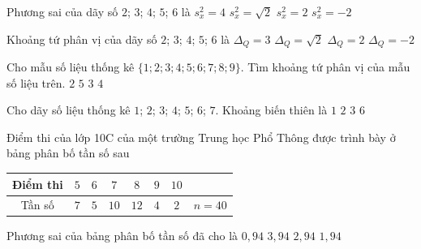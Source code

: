 \begin{ex}%
	Phương sai của dãy số $2$; $3$; $4$; $5$; $6$ là
	\choice
	{$s_x^2=4$}
	{$s_x^2=\sqrt{2}$}
	{\True $s_x^2=2$}
	{$s_x^2=-2$}
\end{ex}

\begin{ex}%
	Khoảng tứ phân vị của dãy số $2$; $3$; $4$; $5$; $6$ là
	\choice
	{\True $\Delta_Q=3$}
	{$\Delta_Q=\sqrt{2}$}
	{$\Delta_Q=2$}
	{$\Delta_Q=-2$}
\end{ex}	

\begin{ex}%
	Cho mẫu số liệu thống kê $\{ 1;2;3;4;5;6;7;8;9 \}$. Tìm khoảng tứ phân vị của mẫu số liệu trên.
	\choice
	{$2$}
	{\True $5$}
	{$3$}
	{$4$}
\end{ex}	

\begin{ex}%
	Cho dãy số liệu thống kê $1$; $2$; $3$; $4$; $5$; $6$; $7$. Khoảng biến thiên là 
	\choice
	{$1$}
	{$2$}
	{$3$}
	{\True $6$}
\end{ex}	

\begin{ex}%
	Điểm thi của lớp 10C của một trường Trung học Phổ Thông được trình bày ở bảng phân bố tần số sau
	\begin{center}
		\begin{tabular}{|c|c|c|c|c|c|c|c|}
			\hline Điểm thi	& $5$ & $6$ & $7$ & $8$ & $9$ & $10$ & \\
			\hline Tần số	& $7$ & $5$ & $10$ & $12$ & $4$ & $2$ & $n=40$\\
			\hline 
		\end{tabular}
	\end{center}
	Phương sai của bảng phân bố tần số đã cho là 
	\choice
	{$0{,}94$}
	{$3{,}94$}
	{$2{,}94$}
	{\True $1{,}94$}
\end{ex}	

